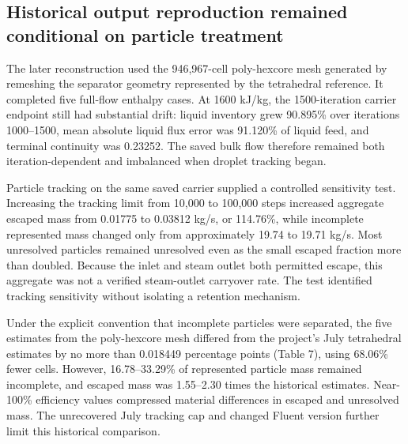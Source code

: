 \subsection{Historical output reproduction remained conditional on particle treatment}

The later reconstruction used the 946,967-cell poly-hexcore mesh generated by remeshing the separator geometry represented by the tetrahedral reference. It completed five full-flow enthalpy cases. At 1600 kJ/kg, the 1500-iteration carrier endpoint still had substantial drift: liquid inventory grew 90.895\% over iterations 1000--1500, mean absolute liquid flux error was 91.120\% of liquid feed, and terminal continuity was 0.23252. The saved bulk flow therefore remained both iteration-dependent and imbalanced when droplet tracking began.

Particle tracking on the same saved carrier supplied a controlled sensitivity test. Increasing the tracking limit from 10,000 to 100,000 steps increased aggregate escaped mass from 0.01775 to 0.03812 kg/s, or 114.76\%, while incomplete represented mass changed only from approximately 19.74 to 19.71 kg/s. Most unresolved particles remained unresolved even as the small escaped fraction more than doubled. Because the inlet and steam outlet both permitted escape, this aggregate was not a verified steam-outlet carryover rate. The test identified tracking sensitivity without isolating a retention mechanism.

Under the explicit convention that incomplete particles were separated, the five estimates from the poly-hexcore mesh differed from the project's July tetrahedral estimates by no more than 0.018449 percentage points (Table 7), using 68.06\% fewer cells. However, 16.78--33.29\% of represented particle mass remained incomplete, and escaped mass was 1.55--2.30 times the historical estimates. Near-100\% efficiency values compressed material differences in escaped and unresolved mass. The unrecovered July tracking cap and changed Fluent version further limit this historical comparison.

